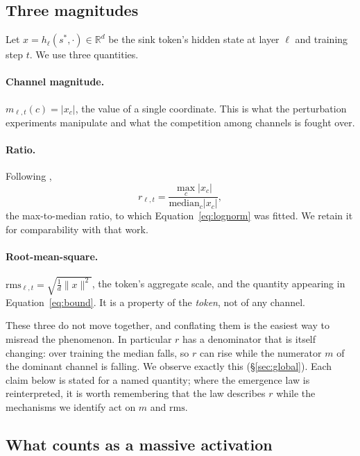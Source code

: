 \documentclass[11pt]{article}
\newcommand{\rms}{\mathrm{rms}}
\begin{document}
\subsection{Three magnitudes}

Let $x = h_\ell(s^\ast,\cdot)\in\mathbb{R}^d$ be the sink token's hidden state at
layer $\ell$ and training step $t$. We use three quantities.

\paragraph{Channel magnitude.} $m_{\ell,t}(c) = |x_c|$, the value of a single
coordinate. This is what the perturbation experiments manipulate and what the
competition among channels is fought over.

\paragraph{Ratio.} Following \citet{gallego2025hidden},
\begin{equation}\label{eq:ratio}
r_{\ell,t} = \frac{\max_c|x_c|}{\mathrm{median}_c|x_c|},
\end{equation}
the max-to-median ratio, to which Equation~\eqref{eq:lognorm} was fitted. We retain
it for comparability with that work.

\paragraph{Root-mean-square.} $\rms_{\ell,t} = \sqrt{\tfrac{1}{d}\lVert x\rVert^2}$,
the token's aggregate scale, and the quantity appearing in
Equation~\eqref{eq:bound}. It is a property of the \emph{token}, not of any channel.

These three do not move together, and conflating them is the easiest way to misread
the phenomenon. In particular $r$ has a denominator that is itself changing: over
training the median falls, so $r$ can rise while the numerator $m$ of the dominant
channel is falling. We observe exactly this (\S\ref{sec:global}). Each claim below
is stated for a named quantity; where the emergence law is reinterpreted, it is
worth remembering that the law describes $r$ while the mechanisms we identify act on
$m$ and $\rms$.

\subsection{What counts as a massive activation}
\end{document}
